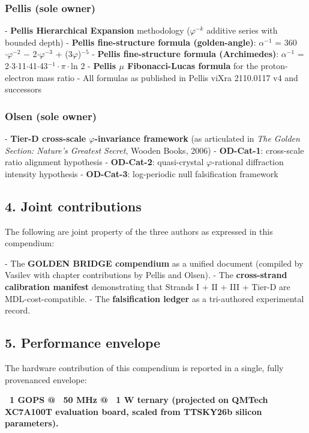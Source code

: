 \subsubsection{Pellis (sole owner)}
- \textbf{Pellis Hierarchical Expansion} methodology ($\varphi^{-k}$ additive series with bounded depth)
- \textbf{Pellis fine-structure formula (golden-angle)}: $\alpha^{-1}$ = 360$\cdot\varphi^{-2}$ $-$ 2$\cdot\varphi^{-3}$ + (3$\varphi$)$^{-5}$
- \textbf{Pellis fine-structure formula (Archimedes)}: $\alpha^{-1}$ = 2$\cdot$3$\cdot$11$\cdot$41$\cdot$43$^{-1}\cdot\pi\cdot$ln 2
- \textbf{Pellis $\mu$ Fibonacci-Lucas formula} for the proton-electron mass ratio
- All formulas as published in Pellis viXra 2110.0117 v4 and successors

\subsubsection{Olsen (sole owner)}
- \textbf{Tier-D cross-scale $\varphi$-invariance framework} (as articulated in \textit{The Golden Section: Nature's Greatest Secret}, Wooden Books, 2006)
- \textbf{OD-Cat-1}: cross-scale ratio alignment hypothesis
- \textbf{OD-Cat-2}: quasi-crystal $\varphi$-rational diffraction intensity hypothesis
- \textbf{OD-Cat-3}: log-periodic null falsification framework

\subsection{4. Joint contributions}

The following are joint property of the three authors as expressed in this compendium:

- The \textbf{GOLDEN BRIDGE compendium} as a unified document (compiled by Vasilev with chapter contributions by Pellis and Olsen).
- The \textbf{cross-strand calibration manifest} demonstrating that Strands I + II + III + Tier-D are MDL-cost-compatible.
- The \textbf{falsification ledger} as a tri-authored experimental record.

\subsection{5. Performance envelope}

The hardware contribution of this compendium is reported in a single, fully provenanced envelope:

\textbf{~1 GOPS @ ~50 MHz @ ~1 W ternary (projected on QMTech XC7A100T evaluation board, scaled from TTSKY26b silicon parameters).}

